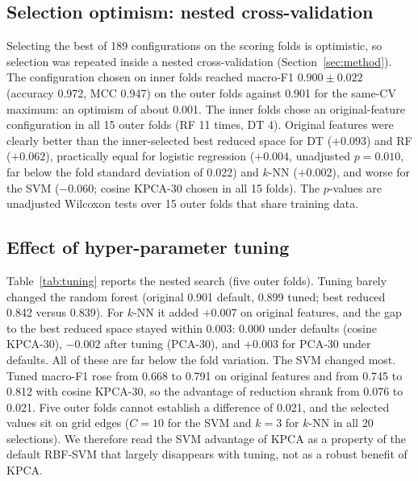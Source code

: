 \documentclass[runningheads]{llncs}
\begin{document}
\subsection{Selection optimism: nested cross-validation}\label{sec:results-nested}
Selecting the best of 189 configurations on the scoring folds is optimistic, so selection was repeated inside a nested cross-validation (Section~\ref{sec:method}). The configuration chosen on inner folds reached macro-F1 $0.900\pm0.022$ (accuracy 0.972, MCC 0.947) on the outer folds against 0.901 for the same-CV maximum: an optimism of about 0.001. The inner folds chose an original-feature configuration in all 15 outer folds (RF 11 times, DT 4). Original features were clearly better than the inner-selected best reduced space for DT ($+0.093$) and RF ($+0.062$), practically equal for logistic regression ($+0.004$, unadjusted $p=0.010$, far below the fold standard deviation of 0.022) and $k$-NN ($+0.002$), and worse for the SVM ($-0.060$; cosine KPCA-30 chosen in all 15 folds). The $p$-values are unadjusted Wilcoxon tests over 15 outer folds that share training data.



\subsection{Effect of hyper-parameter tuning}
Table~\ref{tab:tuning} reports the nested search (five outer folds). Tuning barely changed the random forest (original 0.901 default, 0.899 tuned; best reduced 0.842 versus 0.839). For $k$-NN it added $+0.007$ on original features, and the gap to the best reduced space stayed within 0.003: 0.000 under defaults (cosine KPCA-30), $-0.002$ after tuning (PCA-30), and $+0.003$ for PCA-30 under defaults. All of these are far below the fold variation. The SVM changed most. Tuned macro-F1 rose from 0.668 to 0.791 on original features and from 0.745 to 0.812 with cosine KPCA-30, so the advantage of reduction shrank from 0.076 to 0.021. Five outer folds cannot establish a difference of 0.021, and the selected values sit on grid edges ($C=10$ for the SVM and $k=3$ for $k$-NN in all 20 selections). We therefore read the SVM advantage of KPCA as a property of the default RBF-SVM that largely disappears with tuning, not as a robust benefit of KPCA.

\begin{table}[htbp]
\caption{Nested hyper-parameter search: mean macro-F1 over five outer folds. For each setting (default, tuned) the best reduced space among PCA-30, KPCA-cos-30 and KPCA-RBF-30 is chosen by that setting\textquoteright s own score; $\Delta$ = original $-$ reduced (negative: reduction better). K-cos-30 = KPCA, cosine kernel, 30 components. The last column gives the default-setting gap measured in the tuned-best reduced space.}\label{tab:tuning}
\centering\scriptsize
\resizebox{\textwidth}{!}{}
\end{table}
\end{document}

